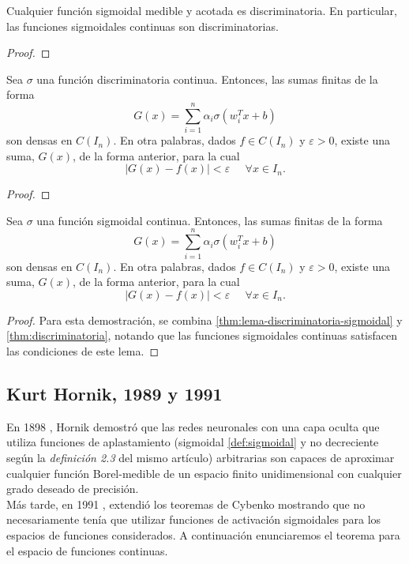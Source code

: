 \begin{itemize}
\begin{lema}\label{thm:lema-discriminatoria-sigmoidal}
Cualquier función sigmoidal medible y acotada es discriminatoria. En particular, las funciones sigmoidales continuas son discriminatorias.
\end{lema}
\begin{proof}
\end{proof}

\begin{teorema}\label{thm:discriminatoria}
Sea $\sigma$ una función discriminatoria continua. Entonces, las sumas finitas de la forma $$G(x)=\sum_{i=1}^n \alpha_i \sigma(w_i^Tx+b)$$ son densas en $C(I_n)$. En otra palabras, dados $f\in C(I_n)$ y $\varepsilon>0$, existe una suma, $G(x)$, de la forma anterior, para la cual $$|G(x)-f(x)|<\varepsilon \;\;\;\;\; \forall x \in I_n.$$
\end{teorema}
\begin{proof}
\end{proof}
\begin{teorema}\label{thm:sigmoidal}
Sea $\sigma$ una función sigmoidal continua. Entonces, las sumas finitas de la forma $$G(x)=\sum_{i=1}^n \alpha_i \sigma(w_i^Tx+b)$$ son densas en $C(I_n)$. En otra palabras, dados $f\in C(I_n)$ y $\varepsilon>0$, existe una suma, $G(x)$, de la forma anterior, para la cual $$|G(x)-f(x)|<\varepsilon \;\;\;\;\; \forall x \in I_n.$$
\end{teorema}
\begin{proof}
Para esta demostración, se combina \autoref{thm:lema-discriminatoria-sigmoidal} y \autoref{thm:discriminatoria}, notando que las funciones sigmoidales continuas satisfacen las condiciones de este lema.
\end{proof}

\subsection{Kurt Hornik, 1989 y 1991}

En 1898 \cite{HornikEtAl89}, Hornik demostró que las redes neuronales con una capa oculta que utiliza funciones de aplastamiento (sigmoidal \autoref{def:sigmoidal} y no decreciente según la \emph{definición 2.3} del mismo artículo) arbitrarias son capaces de aproximar cualquier función Borel-medible de un espacio finito unidimensional con cualquier grado deseado de precisión.\\

Más tarde, en 1991 \cite{Kurt1991251}, extendió los teoremas de Cybenko mostrando que no necesariamente tenía que utilizar funciones de activación sigmoidales para los espacios de funciones considerados. A continuación enunciaremos el teorema para el espacio de funciones continuas.\\


\end{itemize}
